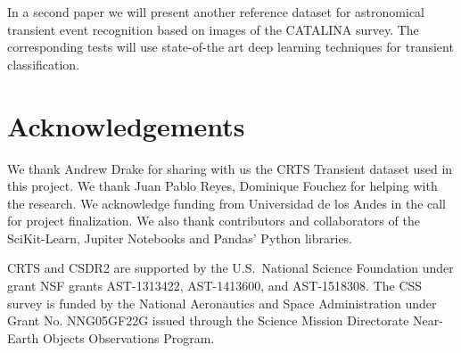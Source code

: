 \documentclass[a4paper,fleqn,usenatbib]{mnras}
\begin{document}
In a second paper we will present another reference dataset for
astronomical transient event recognition based on images of the
CATALINA survey. 
The corresponding tests will use  state-of-the art deep learning
techniques for transient classification. 

\section*{Acknowledgements}

We thank Andrew Drake for sharing with us the CRTS Transient dataset
used in this project.  
We thank Juan Pablo Reyes, Dominique Fouchez for helping with the
research.  
We acknowledge funding from Universidad de los Andes in the call for
project finalization.
We also thank contributors and collaborators of the SciKit-Learn,
Jupiter Notebooks and Pandas' Python libraries.  

CRTS and CSDR2 are supported by the U.S.~National Science 
Foundation under grant NSF grants AST-1313422, AST-1413600, and 
AST-1518308.  The CSS survey is funded by the National Aeronautics
and Space Administration under Grant No. NNG05GF22G issued through
the Science Mission Directorate Near-Earth Objects Observations Program.



\end{document}
